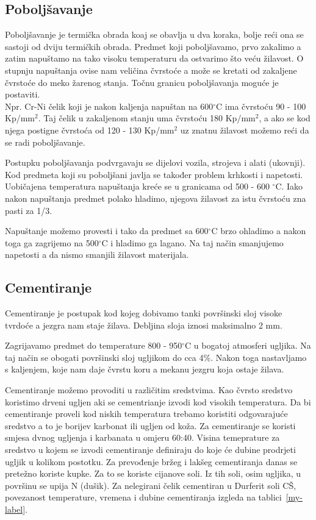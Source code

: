\documentclass[a4paper,12pt]{article}
\numberwithin{figure}{section}
\begin{document}
\subsection{Poboljšavanje}
Poboljšavanje je termička obrada koaj se obavlja u dva koraka, bolje reći ona se sastoji od dviju termičkih obrada. Predmet koji poboljšavamo, prvo zakalimo a zatim napuštamo na tako visoku temperaturu da ostvarimo što veću žilavost. O stupnju napuštanja ovise nam veličina čvrstoće a može se kretati od zakaljene čvrstoće do meko žarenog stanja. Točnu granicu poboljšavanja moguće je postaviti.\\
Npr. Cr-Ni čelik koji je nakon kaljenja napuštan na 600$^{\circ}$C ima čvrstoću 90 - 100 Kp/mm$^{2}$. Taj čelik u zakaljenom stanju uma čvrstoću 180 Kp/mm$^{2}$, a ako se kod njega postigne čvrstoća od 120 - 130 Kp/mm$^{2}$ uz znatnu žilavost možemo reći da se radi poboljšavanje. \par
Postupku poboljšavanja podvrgavaju se dijelovi vozila, strojeva i alati (ukovnji). Kod predmeta koji su poboljšani javlja se također problem krhkosti i napetosti. Uobičajena temperatura napuštanja kreće se u granicama od 500 - 600 $^{\circ}$C. Iako nakon napuštanja predmet polako hladimo, njegova žilavost za istu čvrstoću zna pasti za 1/3.\par
Napuštanje možemo provesti i tako da predmet sa 600$^{\circ}$C brzo ohladimo a nakon toga ga zagrijemo na 500$^{\circ}$C i hladimo ga lagano. Na taj način smanjujemo napetosti a da nismo smanjili žilavost materijala.
\subsection{Cementiranje}
Cementiranje je postupak kod kojeg dobivamo tanki površinski sloj visoke tvrdoće a jezgra nam staje žilava. Debljina sloja iznosi maksimalno 2 mm. \par
Zagrijavamo predmet do temperature 800 - 950$^{\circ}$C u bogatoj atmosferi ugljika. Na taj način se obogati površinski sloj ugljikom do cca 4$\%$. Nakon toga nastavljamo s kaljenjem, koje nam daje čvrstu koru a mekanu jezgru koja ostaje žilava.\par
Cementiranje možemo provoditi u različitim sredstvima. Kao čvrsto sredstvo koristimo drveni ugljen aki se cementrianje izvodi kod visokih temperatura. Da bi cementiranje proveli kod niskih temperatura trebamo koristiti odgovarajuće sredstvo a to je borijev karbonat ili ugljen od koža. Za cementiranje se koristi smjesa dvnog ugljenja i karbanata u  omjeru 60:40. Visina temeprature za sredstvo u kojem se izvodi cementiranje definiraju do koje će dubine prodrjeti ugljik u kolikom postotku. Za prevođenje bržeg i lakšeg cementiranja danas se pretežno koriste kupke. Za to se koriste cijanove soli. Iz tih soli, osim ugljika, u površinu se upija N (dušik). Za nelegirani čelik cementiran u Durferit soli CŠ, povezanost temperature, vremena i dubine cementiranja izgleda na tablici~\ref{my-label}.
\end{document}
